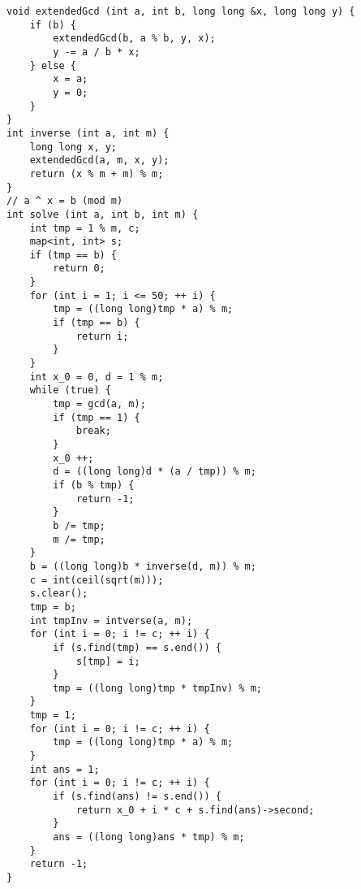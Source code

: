 \begin{lstlisting}
void extendedGcd (int a, int b, long long &x, long long y) {
	if (b) {
		extendedGcd(b, a % b, y, x);
		y -= a / b * x;
	} else {
		x = a;
		y = 0;
	}
}
int inverse (int a, int m) {
	long long x, y;
	extendedGcd(a, m, x, y);
	return (x % m + m) % m;
}
// a ^ x = b (mod m)
int solve (int a, int b, int m) {
	int tmp = 1 % m, c;
	map<int, int> s;
	if (tmp == b) {
		return 0;
	}
	for (int i = 1; i <= 50; ++ i) {
		tmp = ((long long)tmp * a) % m;
		if (tmp == b) {
			return i;
		}
	}
	int x_0 = 0, d = 1 % m;
	while (true) {
		tmp = gcd(a, m);
		if (tmp == 1) {
			break;
		}
		x_0 ++;
		d = ((long long)d * (a / tmp)) % m;
		if (b % tmp) {
			return -1;
		}
		b /= tmp;
		m /= tmp;
	}
	b = ((long long)b * inverse(d, m)) % m;
	c = int(ceil(sqrt(m)));
	s.clear();
	tmp = b;
	int tmpInv = intverse(a, m);
	for (int i = 0; i != c; ++ i) {
		if (s.find(tmp) == s.end()) {
			s[tmp] = i;
		}
		tmp = ((long long)tmp * tmpInv) % m;
	}
	tmp = 1;
	for (int i = 0; i != c; ++ i) {
		tmp = ((long long)tmp * a) % m;
	}
	int ans = 1;
	for (int i = 0; i != c; ++ i) {
		if (s.find(ans) != s.end()) {
			return x_0 + i * c + s.find(ans)->second;
		}
		ans = ((long long)ans * tmp) % m;
	}
	return -1;
}
\end{lstlisting}
